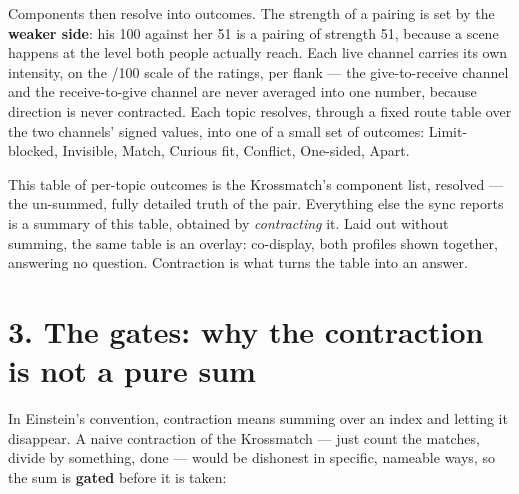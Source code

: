 Components then resolve into outcomes. The strength of a pairing is set
by the \textbf{weaker side}: his 100 against her 51 is a pairing of
strength 51, because a scene happens at the level both people actually
reach. Each live channel carries its own intensity, on the /100 scale of
the ratings, per flank --- the give-to-receive channel and the
receive-to-give channel are never averaged into one number, because
direction is never contracted. Each topic resolves, through a fixed
route table over the two channels' signed values, into one of a small
set of outcomes: Limit-blocked, Invisible, Match, Curious fit, Conflict,
One-sided, Apart.

This table of per-topic outcomes is the Krossmatch's component list,
resolved --- the un-summed, fully detailed truth of the pair. Everything
else the sync reports is a summary of this table, obtained by
\emph{contracting} it. Laid out without summing, the same table is an
overlay: co-display, both profiles shown together, answering no
question. Contraction is what turns the table into an answer.

\section{3. The gates: why the contraction is not a pure
sum}\label{the-gates-why-the-contraction-is-not-a-pure-sum}

In Einstein's convention, contraction means summing over an index and
letting it disappear. A naive contraction of the Krossmatch --- just
count the matches, divide by something, done --- would be dishonest in
specific, nameable ways, so the sum is \textbf{gated} before it is
taken:

